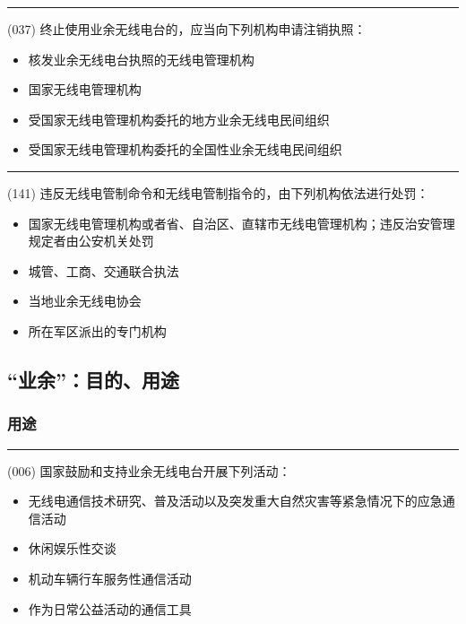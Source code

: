 \documentclass[twocolumn,hyperref,UTF8]{ctexart}  %
\begin{document}
\noindent\rule{0.5\textwidth}{1pt}
\heiti (037) 终止使用业余无线电台的，应当向下列机构申请{\color{cyan}注销}执照： \songti {\color{gray} [LK0046] }
\begin{itemize}
	\item  核发业余无线电台执照的无线电管理机构
	\item  国家无线电管理机构
	\item  受国家无线电管理机构委托的地方业余无线电民间组织
	\item  受国家无线电管理机构委托的全国性业余无线电民间组织
\end{itemize}


\noindent\rule{0.5\textwidth}{1pt}
\heiti (141) {\color{cyan}违反无线电管制}命令和无线电管制指令的，由下列机构依法进行{\color{cyan}处罚}： \songti {\color{gray} [LK0109] }
\begin{itemize}
	\item  国家无线电管理机构或者省、自治区、直辖市无线电管理机构；违反治安管理规定者由公安机关处罚
	\item  城管、工商、交通联合执法
	\item  当地业余无线电协会
	\item  所在军区派出的专门机构
\end{itemize}



\clearpage
\subsection{“业余”：目的、用途}



\subsubsection{用途}


\noindent\rule{0.5\textwidth}{1pt}
\heiti (006) 国家鼓励和支持业余无线电台开展下列活动： \songti {\color{gray} [LK0011] }
\begin{itemize}
	\item  无线电通信技术研究、普及活动以及突发重大自然灾害等紧急情况下的应急通信活动
	\item  {\color{red}休闲娱乐性}交谈
	\item  机动车辆行车{\color{red}服务性}通信活动
	\item  作为{\color{red}日常公益}活动的通信工具
\end{itemize}
\end{document}
